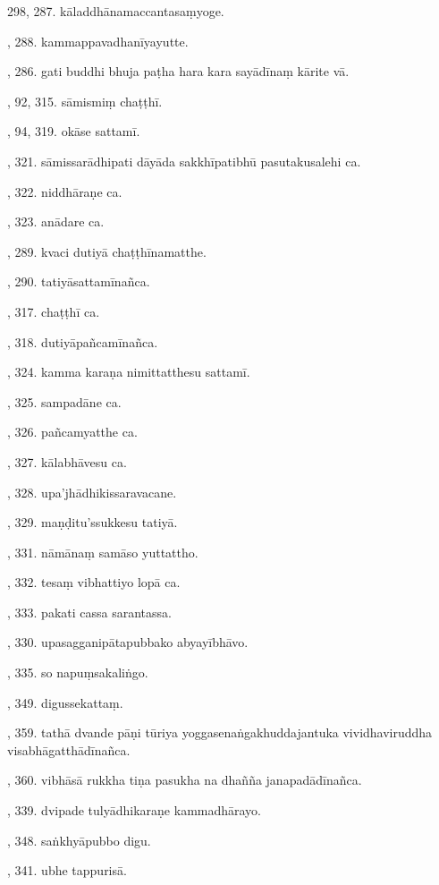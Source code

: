 298, 287. kāladdhānamaccantasaṃyoge.\par {}, 288. kammappavadhanīyayutte.\par {}, 286. gati buddhi bhuja paṭha hara kara sayādīnaṃ kārite vā.\par {}, 92, 315. sāmismiṃ chaṭṭhī.\par {}, 94, 319. okāse sattamī.\par {}, 321. sāmissarādhipati dāyāda sakkhīpatibhū pasutakusalehi ca.\par {}, 322. niddhāraṇe ca.\par {}, 323. anādare ca.\par {}, 289. kvaci dutiyā chaṭṭhīnamatthe.\par {}, 290. tatiyāsattamīnañca.\par {}, 317. chaṭṭhī ca.\par {}, 318. dutiyāpañcamīnañca.\par {}, 324. kamma karaṇa nimittatthesu sattamī.\par {}, 325. sampadāne ca.\par {}, 326. pañcamyatthe ca.\par {}, 327. kālabhāvesu ca.\par {}, 328. upa’jhādhikissaravacane.\par {}, 329. maṇḍitu’ssukkesu tatiyā.\par {}, 331. nāmānaṃ samāso yuttattho.\par {}, 332. tesaṃ vibhattiyo lopā ca.\par {}, 333. pakati cassa sarantassa.\par {}, 330. upasagganipātapubbako abyayībhāvo.\par {}, 335. so napuṃsakaliṅgo.\par {}, 349. digussekattaṃ.\par {}, 359. tathā dvande pāṇi tūriya yoggasenaṅgakhuddajantuka vividhaviruddha visabhāgatthādīnañca.\par {}, 360. vibhāsā rukkha tiṇa pasukha na dhañña janapadādīnañca.\par {}, 339. dvipade tulyādhikaraṇe kammadhārayo.\par {}, 348. saṅkhyāpubbo digu.\par {}, 341. ubhe tappurisā.\par \noindent
